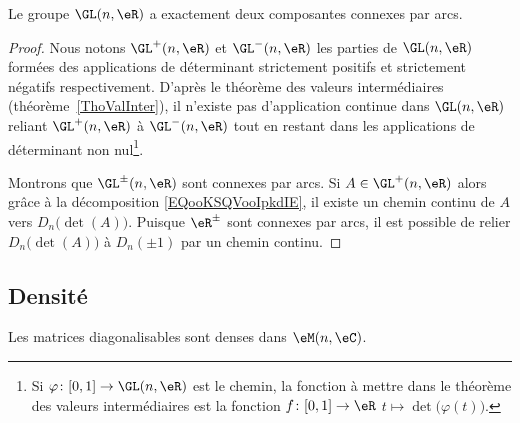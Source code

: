 \begin{proposition} \label{PROPooBIYQooWLndSW}
	Le groupe \( \GL(n,\eR)\) a exactement deux composantes connexes par arcs.
\end{proposition}

\begin{proof}
	Nous notons \( \GL^+(n,\eR)\) et \( \GL^-(n,\eR)\) les parties de \( \GL(n,\eR)\) formées des applications de déterminant strictement positifs et strictement négatifs respectivement. D'après le théorème des valeurs intermédiaires (théorème~\ref{ThoValInter}), il n'existe pas d'application continue dans \( \GL(n,\eR)\) reliant \( \GL^+(n,\eR)\) à \( \GL^-(n,\eR)\) tout en restant dans les applications de déterminant non nul\footnote{Si \( \varphi\colon \mathopen[ 0 , 1 \mathclose]\to \GL(n,\eR)\) est le chemin, la fonction à mettre dans le théorème des valeurs intermédiaires est la fonction \( f\colon \mathopen[ 0 , 1 \mathclose]\to \eR\) \(t\mapsto \det\big( \varphi(t) \big)\).}.

	Montrons que \( \GL^{\pm}(n,\eR)\) sont connexes par arcs. Si \( A\in\GL^+(n,\eR)\) alors grâce à la décomposition \eqref{EQooKSQVooIpkdIE}, il existe un chemin continu de \( A\) vers \( D_n\big( \det(A) \big)\). Puisque \( \eR^{\pm}\) sont connexes par arcs, il est possible de relier \( D_n\big( \det(A) \big)\) à \( D_n(\pm 1)\) par un chemin continu.
\end{proof}

\subsection{Densité}

\begin{proposition}     \label{PropDigDensVxzPuo}
	Les matrices diagonalisables sont denses dans \( \eM(n,\eC)\).
\end{proposition}

